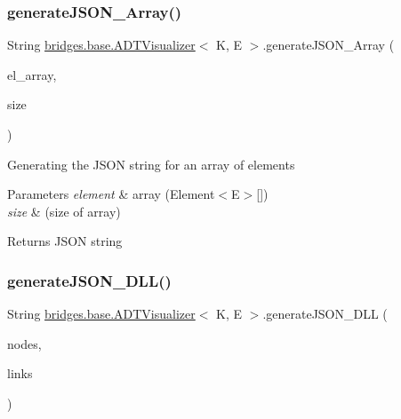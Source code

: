 \subsubsection{\texorpdfstring{generate\+J\+S\+O\+N\+\_\+\+Array()}{generateJSON\_Array()}\hspace{0.1cm}{\footnotesize\ttfamily [2/2]}}
{\footnotesize\ttfamily String \hyperlink{classbridges_1_1base_1_1_a_d_t_visualizer}{bridges.\+base.\+A\+D\+T\+Visualizer}$<$ K, E $>$.generate\+J\+S\+O\+N\+\_\+\+Array (\begin{DoxyParamCaption}\item[{\hyperlink{classbridges_1_1base_1_1_element}{Element}$<$ E $>$ \mbox{[}$\,$\mbox{]}}]{el\+\_\+array,  }\item[{int}]{size }\end{DoxyParamCaption})}

Generating the J\+S\+ON string for an array of elements


\begin{DoxyParams}{Parameters}
{\em element} & array (Element$<$\+E$>$\mbox{[}\mbox{]}) \\
\hline
{\em size} & (size of array)\\
\hline
\end{DoxyParams}
\begin{DoxyReturn}{Returns}
J\+S\+ON string 
\end{DoxyReturn}
\hypertarget{classbridges_1_1base_1_1_a_d_t_visualizer_a866df531965d152d5686304f07e15a4a}{}\label{classbridges_1_1base_1_1_a_d_t_visualizer_a866df531965d152d5686304f07e15a4a} 
\subsubsection{\texorpdfstring{generate\+J\+S\+O\+N\+\_\+\+D\+L\+L()}{generateJSON\_DLL()}}
{\footnotesize\ttfamily String \hyperlink{classbridges_1_1base_1_1_a_d_t_visualizer}{bridges.\+base.\+A\+D\+T\+Visualizer}$<$ K, E $>$.generate\+J\+S\+O\+N\+\_\+\+D\+LL (\begin{DoxyParamCaption}\item[{Linked\+List$<$ \hyperlink{classbridges_1_1base_1_1_d_lelement}{D\+Lelement}$<$ E $>$$>$}]{nodes,  }\item[{Linked\+List$<$ \hyperlink{classbridges_1_1base_1_1_d_lelement}{D\+Lelement}$<$ E $>$$>$}]{links }\end{DoxyParamCaption})}

